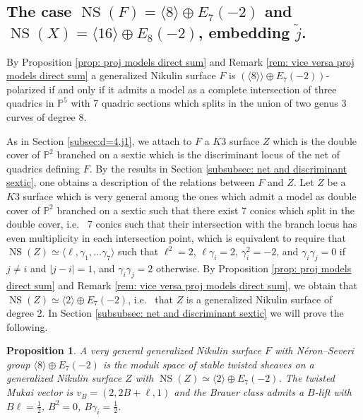 \documentclass{amsart}
\newtheorem{prop}[thm]{Proposition}
\theoremstyle{definition}
\numberwithin{equation}{section}
\numberwithin{equation}{section} \theoremstyle{definition}
\DeclareMathOperator{\NS}{NS}
\begin{document}
\subsection{The case $\NS(F)=\langle 8\rangle\oplus E_7(-2)$ and $\NS(X)=\langle 16\rangle\oplus E_8(-2)$, embedding $\widetilde{j}$.} By Proposition \ref{prop: proj models direct sum} and Remark \ref{rem: vice versa proj models direct sum} a generalized Nikulin surface $F$ is $\left(\langle 8\rangle\rangle\oplus E_7(-2)\right)$-polarized if and only if it admits a model as a complete intersection of three quadrics in $\mathbb{P}^5$ with 7 quadric sections which splits in the union of two genus 3 curves of degree 8. 

As in Section \ref{subsec:d=4,j1}, we attach to $F$ a $K3$ surface $Z$ which is the double cover of $\mathbb{P}^2$ branched on a sextic which is the discriminant locus of the net of quadrics defining $F$.
By the results in Section \ref{subsubsec: net and discriminant sextic}, one obtains a description of the relations between $F$ and $Z$. Let $Z$ be a $K3$ surface which is very general among the ones which admit a model as double cover of $\mathbb{P}^2$ branched on a sextic such that there exist 7 conics which split in the double cover, i.e.~ 7 conics such that their intersection with the branch locus has even multiplicity in each intersection point, which is equivalent to require that $\NS(Z)\simeq \langle \ell, \gamma_1,\ldots \gamma_7\rangle$ such that $\ell^2=2$, $\ell\gamma_i=2$, $\gamma_i^2=-2$, and $\gamma_i\gamma_j=0$ if $j\neq i$ and $|j-i|= 1$, and $\gamma_i\gamma_j=2$ otherwise. By Proposition \ref{prop: proj models direct sum} and Remark \ref{rem: vice versa proj models direct sum}, we obtain that $\NS(Z)\simeq \langle 2\rangle\oplus E_7(-2)$, i.e.~ that $Z$ is a generalized Nikulin surface of degree 2. In Section \ref{subsubsec: net and discriminant sextic} we will prove the following.
\begin{prop}\label{prop: 8+G and 2+G related by twisted moduli space}
 A very general generalized Nikulin surface $F$ with N\'eron--Severi group $\langle 8\rangle\oplus E_7(-2)$ is the moduli space of stable twisted sheaves on a generalized Nikulin surface $Z$ with $\NS(Z)\simeq \langle 2\rangle\oplus E_7(-2)$.
 The twisted Mukai vector is $v_B=(2,2B+\ell,1)$ and the Brauer class admits a $B$-lift with $B\ell=\frac{1}{2}$, $B^2=0$,
 $B\gamma_i=\frac{1}{2}$.
\end{prop}
\end{document}
